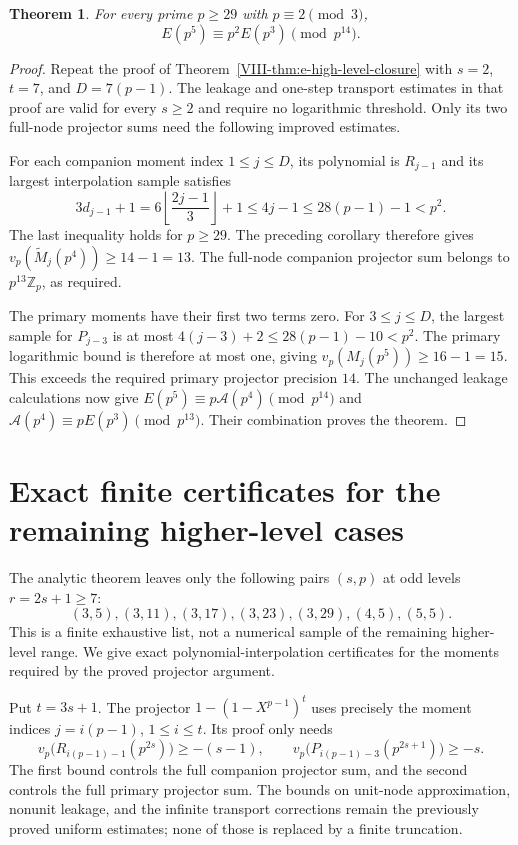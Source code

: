 \documentclass[11pt,letterpaper]{article}
\newtheorem{theorem}{Theorem}[section]
\numberwithin{equation}{section}
\begin{document}
\begin{theorem}\label{VIII-thm:e-level-five-large-primes}
For every prime $p\ge29$ with $p\equiv2\pmod3$,
\[
 \boxed{E(p^5)\equiv p^2E(p^3)\pmod{p^{14}}.}
\]
\end{theorem}
\begin{proof}
Repeat the proof of Theorem~\ref{VIII-thm:e-high-level-closure} with
$s=2$, $t=7$, and $D=7(p-1)$. The leakage and one-step transport
estimates in that proof are valid for every $s\ge2$ and require
no logarithmic threshold. Only its two full-node projector sums
need the following improved estimates.

For each companion moment index $1\le j\le D$, its polynomial
is $R_{j-1}$ and its largest interpolation sample satisfies
\[
 3d_{j-1}+1
 =6\left\lfloor\frac{2j-1}{3}\right\rfloor+1
 \le4j-1\le28(p-1)-1<p^2.
\]
The last inequality holds for $p\ge29$. The preceding corollary
therefore gives
$v_p(\widetilde M_j(p^4))\ge14-1=13$.
The full-node companion projector sum belongs to $p^{13}\mathbb Z_p$,
as required.

The primary moments have their first two terms zero. For $3\le j\le D$,
the largest sample for $P_{j-3}$ is at most
$4(j-3)+2\le28(p-1)-10<p^2$.
The primary logarithmic bound is therefore at most one, giving
$v_p(M_j(p^5))\ge16-1=15$. This exceeds the required primary
projector precision $14$. The unchanged leakage calculations now
give $E(p^5)\equiv p\mathcal A(p^4)\pmod{p^{14}}$ and
$\mathcal A(p^4)\equiv pE(p^3)\pmod{p^{13}}$.
Their combination proves the theorem.
\end{proof}

\section{Exact finite certificates for the remaining higher-level cases}\label{loc-VIII-12}
\label{VIII-sec:E7finiteexceptions}
The analytic theorem leaves only the following pairs $(s,p)$ at
odd levels $r=2s+1\ge7$:
\[
 (3,5),(3,11),(3,17),(3,23),(3,29),(4,5),(5,5).
\]
This is a finite exhaustive list, not a numerical sample of the
remaining higher-level range. We give exact polynomial-interpolation
certificates for the moments required by the proved projector argument.

Put $t=3s+1$. The projector $1-(1-X^{p-1})^t$ uses precisely the
moment indices $j=i(p-1)$, $1\le i\le t$. Its proof only needs
\begin{equation}\label{VIII-E7:finite-required}
 v_p\bigl(R_{i(p-1)-1}(p^{2s})\bigr)\ge-(s-1),\qquad
 v_p\bigl(P_{i(p-1)-3}(p^{2s+1})\bigr)\ge-s.
\end{equation}
The first bound controls the full companion projector sum, and the
second controls the full primary projector sum. The bounds on unit-node
approximation, nonunit leakage, and the infinite transport corrections
remain the previously proved uniform estimates; none of those is
replaced by a finite truncation.
\end{document}
